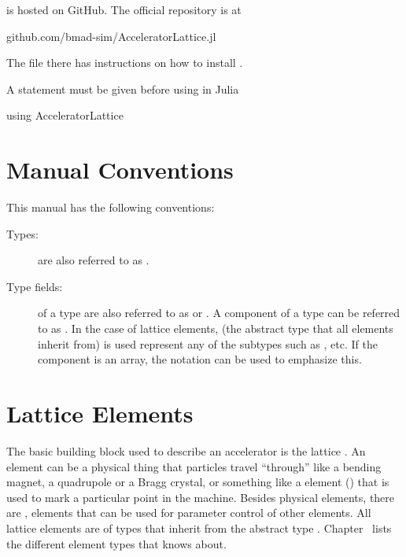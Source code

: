 \accellat is hosted on GitHub. The official repository is at
\begin{example}
  github.com/bmad-sim/AcceleratorLattice.jl
\end{example}
The  file there has instructions on how to install \accellat.

A  statement must be given before using \accellat in Julia
\begin{example}
  using AcceleratorLattice
\end{example}

\section{Manual Conventions}
\label{s:manual.con}

This manual has the following conventions:
\begin{description}
%
\item[Types:]
 are also referred to as .
%
\item[Type fields:]
 of a type are also referred to as  or .
A component  of a type  can be referred to as . In the case
of lattice elements,  (the abstract type that all elements inherit from) is
used represent any of the subtypes such as , etc. If the component
is an array, the notation  can be used to emphasize this.
%
\end{description}


\section{Lattice Elements}
\label{s:element.def}

The basic building block used to describe an accelerator is the lattice . An
element can be a physical thing that particles travel ``through'' like a bending magnet, a
quadrupole or a Bragg crystal, or something like a  element () that is used
to mark a particular point in the machine. Besides physical elements, there are ,
elements that can be used for parameter control of other elements. All lattice elements are of types
that inherit from the abstract type .
Chapter~ lists the different element types that \bmad knows about.

